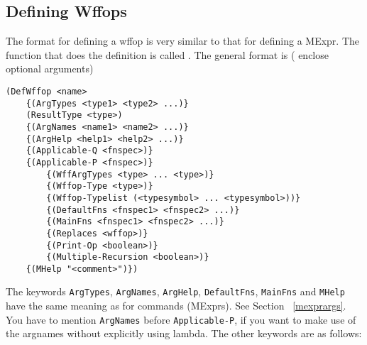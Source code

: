 \subsection{Defining Wffops}\label{defwffop}
The format for defining a wffop is very similar to that for defining a
MExpr.  The function that does the definition is called
.  The general format is ({\tt {}} enclose optional
arguments)
\begin{verbatim}
(DefWffop <name>
	{(ArgTypes <type1> <type2> ...)}
	(ResultType <type>)
	{(ArgNames <name1> <name2> ...)}
	{(ArgHelp <help1> <help2> ...)}
	{(Applicable-Q <fnspec>)}
	{(Applicable-P <fnspec>)}
        {(WffArgTypes <type> ... <type>)}
        {(Wffop-Type <type>)}
        {(Wffop-Typelist (<typesymbol> ... <typesymbol>))}
        {(DefaultFns <fnspec1> <fnspec2> ...)}
        {(MainFns <fnspec1> <fnspec2> ...)}
        {(Replaces <wffop>)}
        {(Print-Op <boolean>)}
        {(Multiple-Recursion <boolean>)}
	{(MHelp "<comment>")})
\end{verbatim}

The keywords {\tt ArgTypes}, {\tt ArgNames}, {\tt ArgHelp}, {\tt DefaultFns},
{\tt MainFns} and {\tt MHelp} have the
same meaning as for commands (MExprs).  See Section ~\ref{mexprargs}.
You have to mention {\tt ArgNames} before {\tt Applicable-P}, if you want to make
use of the argnames without explicitly using lambda.
The other keywords are as follows:

